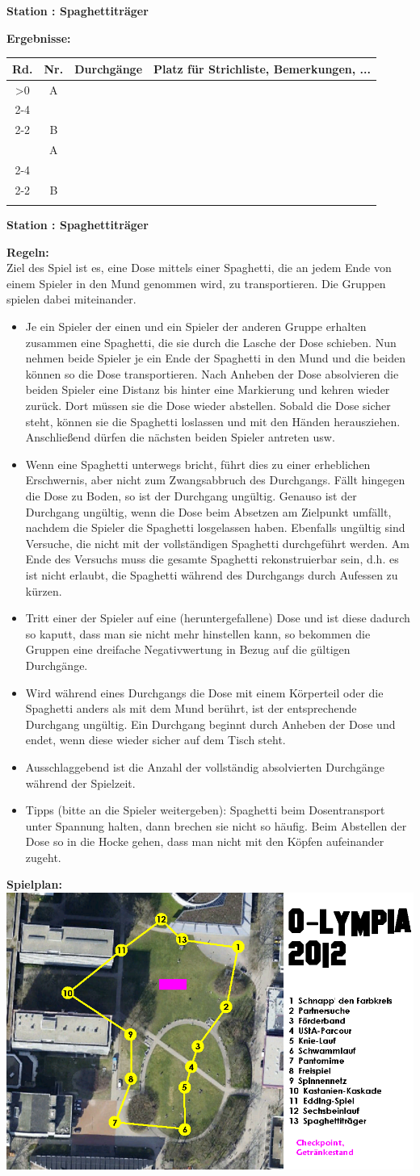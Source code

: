 \documentclass{scrartcl}
\newcommand{\replicate}[2]{\ifnum#1>0 #2
	\expandafter\replicate\expandafter{\number\numexpr#1-1}{#2}\fi}
\newcommand{\modulo}[2]{#1-((#1+#2)/#2-1)*#2}
\newcounter{station}\setcounter{station}{1}
\newcounter{ctrA}
\newcounter{ctrB}
\newcounter{currentRow}
\newcounter{noOfStations}\setcounter{noOfStations}{13}
\newenvironment{stationsheet}[3]
{\begin{center} \textbf{\huge Station \arabic{station}: #1}\\[2em]\end{center}
\textbf{\Large Ergebnisse:}\\[1em]
\setcounter{ctrA}{\value{station}}
\setcounter{ctrB}{\value{station}}
\setcounter{currentRow}{1}
\begin{tabular}{|c|c|p{3cm}|p{11cm}|}
\hline
\textbf{Rd.} & \textbf{Nr.} & \textbf{#2} & \textbf{Platz für Strichliste, Bemerkungen, ...}\\ \hline
\replicate{\value{noOfStations}}
{
\multirow{2}{*}{\arabic{currentRow}} & A\arabic{ctrA} & &
\ifthenelse{#3=0}{\\ \cline{2-4}}{\\ \cline{2-2}}
 & B\arabic{ctrB} & & \stepcounter{currentRow}
\setcounter{ctrA}{1+\modulo{\value{ctrA}-2}{\value{noOfStations}}}
\setcounter{ctrB}{1+\modulo{\value{ctrB}}{\value{noOfStations}}}
\\ \hline
}
\end{tabular}
\clearpage
\begin{center}\textbf{\huge Station \arabic{station}: #1}\\[1em]\end{center}
\textbf{\Large Regeln:}\\[1em]
}
{
\textbf{\Large Spielplan:}\\[1em]
\includegraphics[scale=0.53]{spielplan_klein.png}
\addtocounter{station}{1}
\clearpage
}
\begin{document}
\begin{stationsheet}{Spaghettiträger}{Durchgänge}{1}
Ziel des Spiel ist es, eine Dose mittels einer Spaghetti, die an jedem Ende von einem Spieler in den Mund genommen wird, zu transportieren. Die Gruppen spielen dabei miteinander.
\begin{itemize}
\item Je ein Spieler der einen und ein Spieler der anderen Gruppe erhalten zusammen eine Spaghetti, die sie durch die Lasche der Dose schieben. Nun nehmen beide Spieler je ein Ende der Spaghetti in den Mund und die beiden können so die Dose transportieren. Nach Anheben der Dose absolvieren die beiden Spieler eine Distanz bis hinter eine Markierung und kehren wieder zurück. Dort müssen sie die Dose wieder abstellen. Sobald die Dose sicher steht, können sie die Spaghetti loslassen und mit den Händen herausziehen. Anschließend dürfen die nächsten beiden Spieler antreten usw.
\item Wenn eine Spaghetti unterwegs bricht, führt dies zu einer erheblichen Erschwernis, aber nicht zum Zwangsabbruch des Durchgangs. Fällt hingegen die Dose zu Boden, so ist der Durchgang ungültig. Genauso ist der Durchgang ungültig, wenn die Dose beim Absetzen am Zielpunkt umfällt, nachdem die Spieler die Spaghetti losgelassen haben. Ebenfalls ungültig sind Versuche, die nicht mit der vollständigen Spaghetti durchgeführt werden. Am Ende des Versuchs muss die gesamte Spaghetti rekonstruierbar sein, d.h. es ist nicht erlaubt, die Spaghetti während des Durchgangs durch Aufessen zu kürzen.
\item Tritt einer der Spieler auf eine (heruntergefallene) Dose und ist diese dadurch so kaputt, dass man sie nicht mehr hinstellen kann, so bekommen die Gruppen eine dreifache Negativwertung in Bezug auf die gültigen Durchgänge.
\item Wird während eines Durchgangs die Dose mit einem Körperteil oder die Spaghetti anders als mit dem Mund berührt, ist der entsprechende Durchgang ungültig. Ein Durchgang beginnt durch Anheben der Dose und endet, wenn diese wieder sicher auf dem Tisch steht.
\item Ausschlaggebend ist die Anzahl der vollständig absolvierten Durchgänge während der Spielzeit.
\item Tipps (bitte an die Spieler weitergeben): Spaghetti beim Dosentransport unter Spannung halten, dann brechen sie nicht so häufig. Beim Abstellen der Dose so in die Hocke gehen, dass man nicht mit den Köpfen aufeinander zugeht.
\end{itemize}
\end{stationsheet}
\end{document}
